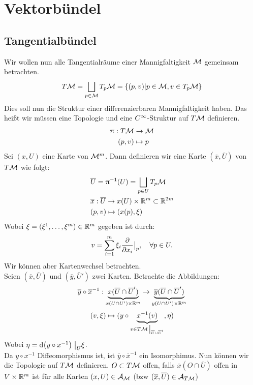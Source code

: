 \chapter{Vektorbündel}
\section{Tangentialbündel}
Wir wollen nun alle Tangentialräume einer Mannigfaltigkeit $\mathcal{M}$ gemeinsam betrachten.
\begin{align}
T\mathcal{M} = \bigsqcup_{p\in \mathcal{M}} T_{p}\mathcal{M} = \{ (p, v) \vert p \in \mathcal{M}, v \in T_{p}\mathcal{M} \} 
\end{align}
Dies soll nun die Struktur einer differenzierbaren Mannigfaltigkeit haben. 
Das heißt wir müssen eine Topologie und eine $C^\infty$-Struktur auf $T\mathcal{M}$ definieren.
\begin{align*}
\uppi: T\mathcal{M} &\to \mathcal{M} \\
(p,v) &\mapsto p
\end{align*}
Sei $(x, U)$ eine Karte von $\mathcal{M}^m$. 
Dann definieren wir eine Karte $(\overline{x}, \overline{U})$ von $T\mathcal{M}$ wie folgt:
\begin{align*}
&\overline{U} = \uppi^{-1}(U) = \bigsqcup_{p\in U} T_{p}\mathcal{M} \\
&\overline{x}: \overline{U} \to x(U) \times \mathbb{R}^m \subset \mathbb{R}^{2m} \\
&(p, v) \mapsto (x(p), \xi)
\end{align*}
Wobei $\xi = (\xi^1, \dots, \xi^m) \in \mathbb{R}^m$ gegeben ist durch:
\begin{align}
v = \sum_{i=1}^{m} \xi_i \pdv{x_i} \big\vert_p, \quad \forall p \in U.
\end{align}
Wir können aber Kartenwechsel betrachten.\\
Seien $(\overline{x}, \overline{U})$ und $(\overline{y}, \overline{U}')$ zwei Karten. 
Betrachte die Abbildungen:
\begin{align*}
\overline{y} \circ \overline{x}^{-1} : \underbrace{x (\overline{U} \cap \overline{U}')}_{x(U \cap U') \times \mathbb{R}^m} \to \underbrace{\overline{y}(\overline{U} \cap \overline{U}')}_{y(U \cap U') \times \mathbb{R}^m}
\end{align*}
\begin{align*}
(v,\xi) \mapsto (y \circ \underbrace{x^{-1}(v)}_{v \in T \mfk\eval_{\overline{U} \cup \overline{U}'}}, \eta) 
\end{align*}
Wobei $\eta = \dd (y \circ x^{-1})\eval_U \xi$.\\
Da $y\circ x^{-1}$ Diffeomorphismus ist, ist $\overline{y} \circ \overline{x}^{-1}$ ein Isomorphimus.
Nun können wir die Topologie auf $T\mathcal{M}$ definieren.
$O \subset T\mathcal{M}$ offen, falls $\overline{x}(O\cap \overline{U})$ offen in $V \times \mathbb{R}^m$ ist für alle Karten $(x, U) \in \mathcal{A}_{\mathcal{M}}$ (bzw $(\overline{x}, \overline{U}) \in \mathcal{A}_{T\mathcal{M}}$)

